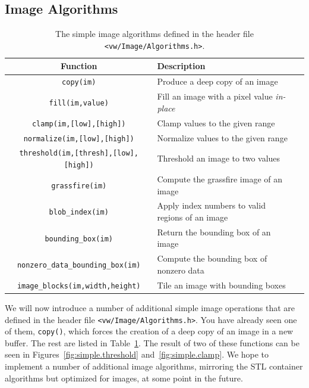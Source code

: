 \subsection{Image Algorithms}

\begin{table}[t]\begin{centering}
\begin{tabular}{|c|l|l|} \hline
Function & Description \\ \hline \hline
\verb#copy(im)# & Produce a deep copy of an image \\ \hline
\verb#fill(im,value)# & Fill an image with a pixel value {\it in-place} \\ \hline
\verb#clamp(im,[low],[high])# & Clamp values to the given range \\ \hline
\verb#normalize(im,[low],[high])# & Normalize values to the given range \\ \hline
\verb#threshold(im,[thresh],[low],[high])# & Threshold an image to two values \\ \hline
\verb#grassfire(im)# & Compute the grassfire image of an image \\ \hline
\verb#blob_index(im)# & Apply index numbers to valid regions of an image \\ \hline
\verb#bounding_box(im)# & Return the bounding box of an image \\ \hline
\verb#nonzero_data_bounding_box(im)# & Compute the bounding box of nonzero data \\ \hline
\verb#image_blocks(im,width,height)# & Tile an image with bounding boxes \\ \hline
\end{tabular}
\caption{The simple image algorithms defined in the header file {\tt <vw/Image/Algorithms.h>}.}
\label{tbl:image-algorithms}
\end{centering}\end{table}

We will now introduce a number of additional simple image operations
that are defined in the header file \verb#<vw/Image/Algorithms.h>#.
You have already seen one of them, \verb#copy()#, which forces the
creation of a deep copy of an image in a new buffer.  The rest are
listed in Table~\ref{tbl:image-algorithms}.  The result of two of
these functions can be seen in Figures~\ref{fig:simple.threshold}
and~\ref{fig:simple.clamp}.  We hope to implement a number of
additional image algorithms, mirroring the STL container algorithms
but optimized for images, at some point in the future.

